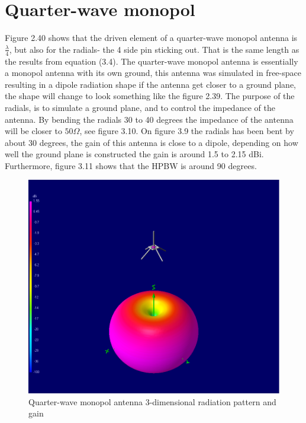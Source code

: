 \newpage

\section{Quarter-wave monopol}
Figure 2.40 shows that the driven element of a quarter-wave monopol antenna is $\frac{\lambda}{4}$, but also for the radials- the 4 side pin sticking out. That is the same length as the results from equation (3.4). The quarter-wave monopol antenna is essentially a monopol antenna with its own ground, this antenna was simulated in free-space resulting in a dipole radiation shape if the antenna get closer to a ground plane, the shape will change to look something like the figure 2.39. The purpose of the radials, is to simulate a ground plane, and to control the impedance of the antenna. By bending the radials 30 to 40 degrees the impedance of the antenna will be closer to $50\Omega$, see figure 3.10. On figure 3.9 the radials has been bent by about 30 degrees, the gain of this antenna is close to a dipole, depending on how well the ground plane is constructed the gain is around 1.5 to 2.15 dBi. Furthermore, figure 3.11 shows that the HPBW is around 90 degrees.      

\begin{figure}[h!]
\hspace*{-1.5cm}
\includegraphics[scale=0.7]{figures/QuaterwaveMonopolAntennaRad.PNG}
\caption{Quarter-wave monopol antenna 3-dimensional radiation pattern and gain}
\end{figure}

